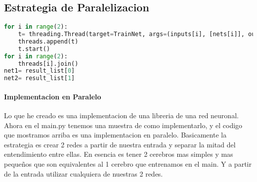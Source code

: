 \subsection{Estrategia de Paralelizacion}
\begin{lstlisting}[language=Python]
for i in range(2):
	t= threading.Thread(target=TrainNet, args=(inputs[i], [nets[i]], outputs[i], i, result_list))
	threads.append(t)
	t.start()
for i in range(2):
	threads[i].join()
net1= result_list[0]
net2= result_list[1]
\end{lstlisting}
\paragraph{Implementacion en Paralelo} Lo que he creado es una implementacion de una libreria de una red neuronal. Ahora en el main.py tenemos una muestra de como implementarlo, y el codigo que mostramos arriba es una implementacion en paralelo. Basicamente la estrategia es crear 2 redes a partir de nuestra entrada y separar la mitad del entendimiento entre ellas. En esencia es tener 2 cerebros mas simples y mas peque\~nos que son equivalentes al 1 cerebro que entrenamos en el main. Y a partir de la entrada utilizar cualquiera de nuestras 2 redes.
